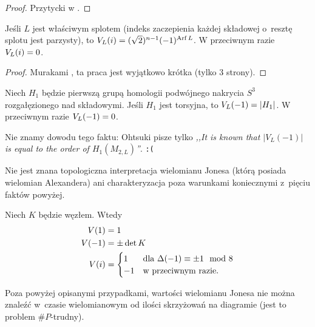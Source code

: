 \begin{proof}
%
    Przytycki w \cite{przytycki1998}.
\end{proof}

\begin{proposition}
    Jeśli $L$ jest właściwym splotem (indeks zaczepienia każdej składowej o~resztę splotu jest parzysty), to $V_L(i) = (\sqrt 2)^{n-1}(-1)^{\operatorname{Arf} L}$.
    W przeciwnym razie $V_L(i) = 0$.
\end{proposition}

\begin{proof}
%
    Murakami \cite{murakami1986}, ta praca jest wyjątkowo krótka (tylko 3 strony).
\end{proof}

\begin{proposition}
    Niech $H_1$ będzie pierwszą grupą homologii podwójnego nakrycia $S^3$ rozgałęzionego nad składowymi.
    Jeśli $H_1$ jest torsyjna, to $V_L(-1) = |H_1|$.
    W przeciwnym razie $V_L(-1) = 0$.
\end{proposition}

Nie znamy dowodu tego faktu: Ohtsuki \cite[s. 383]{ohtsuki2002} pisze tylko \emph{,,It is known that $|V_L(-1)|$ is equal to the order of $H_1(M_{2,L})$''}. \hfill \texttt{:(}

Nie jest znana topologiczna interpretacja wielomianu Jonesa (którą posiada wielomian Alexandera) ani charakteryzacja poza warunkami koniecznymi z~pięciu faktów powyżej.

\begin{corollary}
    Niech $K$ będzie węzłem.
    Wtedy
    \begin{align}
        V(1) & = 1 \\
        V(-1) & = \pm \det K \\
        V(i) & = \begin{cases}
            1 & \text{dla } \Delta(-1) \equiv \pm 1 \mod 8 \\
            -1 & \text{w przeciwnym razie.}
        \end{cases}
    \end{align}
\end{corollary}

Poza powyżej opisanymi przypadkami, wartości wielomianu Jonesa nie można znaleźć w~czasie wielomianowym od ilości skrzyżowań na diagramie (jest to problem $\#P$-trudny).




